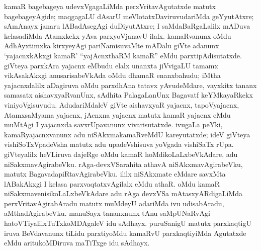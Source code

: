 kamaR bagebageya udevxVgagaLiMda perxVritavAgutatxde matutx bagebageyAgide; maqgagaLU dAsarU meVlotatxDaviruvudariMda geYyutAtxre; sAmAnayx janaru lABa\-dAsegAgi duDiyutAtxre; I saMdaBaRgaLalilx mADuva kelasadiMda Atamxkekx yAva parxyoVjanavU ilalx. kamaRvanunx oMdu AdhAyxtimxka kirxyeyAgi pariNamisuvaMte mADalu giVte adanunx `yajacnxkAkxgi kamaR' ``yajAcnxthaRM kamaR'' eMdu parxtipAdi\-sutatxde. giVteya parxkAra yajacnx eMbudu elalx unanxta jiVvigaLU tamamx vikAsakAkxgi anusarisabeVkAda oMdu dhamaR enanxbahudu; iMtha yajacnxdalilx aDagiruva oMdu parxdhAna tatavx yAvudeMdare, vayxkitx tananx samasatx aishavxyaRvanUnx, sAdhita PalagaLanUnx Bagavatf keYMkayaRkekx viniyoVgisuvudu. AdudariMdaleV giVte aishavxyaR yajacnx, tapoVyajacnx, AtamxsaMyama yajacnx, jAcnxna yajacnx matutx kamaR yajacnx eMdu \hbox{muMtAgi} I yajacnxda savxrUpavanunx vivarisutatxde. ivugaLa peYki, kamaRyajacnxvanunx adu niSAkxmakamaRveMdU kareyutatxde; ideV giVteya vishiSoTxVpadeVsha matutx adu upa\-deVshisuva yoVgada vishiSaTx rUpa. giVteyalilx heVLiruva dajeRge oMdu kamaR hoMdikoLaLxbeVkAdare, adu niSakxmavAgirabeVku. rAga-devxVSarahita athavA niSAkxma\-vAgirabeVku, matutx BagavadapiRtavAgirabeVku. ililx niSAkxmate eMdare savxMta lABakAkxgi I kelasa parxvaqtatxvAgilalx eMdu athaR. oMdu kamaR niSakxmavenisikoLaLxbeVkAdare adu rAga devxVSa mAtasxyARdigaLiMda perxVritavAgirabAradu matutx muMdeyU adariMda ivu udisabAradu, aMthadAgirabeVku. manuSayx tananxnunx tAnu saMpUNaRvAgi hatoVTiyalilxTuTxkoMDAgaleV idu sAdhayx. puruSanigU matutx parxkaqtigU iruva BeVdavanunx tiLidu parxtiyoMdu kamaRvU parxkaqtiyiMda Agutatxde eMdu aritukoMDiruva maTiTxge idu sAdhayx.

